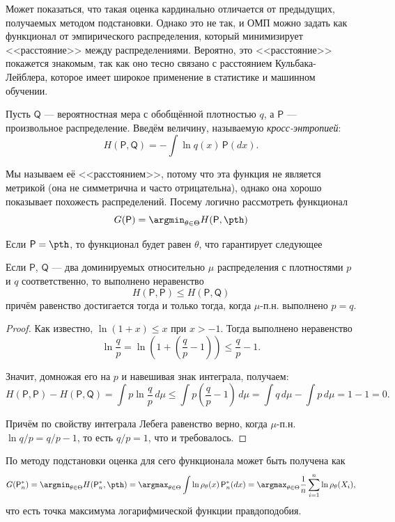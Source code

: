 {\small
Может показаться, что такая оценка кардинально отличается от предыдущих, получаемых методом подстановки. Однако это не так, и ОМП можно задать как функционал от эмпирического распределения, который минимизирует <<расстояние>> между распределениями. Вероятно, это <<расстояние>> покажется знакомым, так как оно тесно связано с расстоянием Кульбака-Лейблера, которое имеет широкое применение в статистике и машинном обучении.

\begin{definition}
    Пусть $\mathsf{Q}$ --- вероятностная мера с обобщённой плотностью $q$, а $\mathsf{P}$ --- произвольное распределение. Введём величину, называемую \textit{кросс-энтропией}:
    \[
    H(\mathsf{P}, \mathsf{Q}) = -\int \ln{q(x)}\,\mathsf{P}(dx). 
    \]
\end{definition}

Мы называем её <<расстоянием>>, потому что эта функция не является метрикой (она не симметрична и часто отрицательна), однако она хорошо показывает похожесть распределений. Посему логично рассмотреть функционал
\[
G(\mathsf{P}) = \argmin_{\theta \in \Theta} H(\mathsf{P}, \pth)
\]

Если $\mathsf{P} = \pth$, то функционал будет равен $\theta$, что гарантирует следующее

\begin{proposition}
    Если $\mathsf{P}$, $\mathsf{Q}$ --- два доминируемых относительно $\mu$ распределения с плотностями $p$ и $q$ соответственно, то выполнено неравенство
    \[
    H(\mathsf{P}, \mathsf{P}) \le H(\mathsf{P}, \mathsf{Q})
    \]
    причём равенство достигается тогда и только тогда, когда $\mu$-п.н. выполнено $p = q$.
\end{proposition}

\begin{proof}
    Как известно, $\ln{(1+x)} \le x$ при $x > -1$. Тогда выполнено неравенство
    \[
    \ln{\frac{q}{p}} = \ln{\left(1 + \left(\frac{q}{p} - 1\right)\right)} \le \frac{q}{p} - 1.
    \]

    Значит, домножая его на $p$ и навешивая знак интеграла, получаем:
    \[
    H(\mathsf{P}, \mathsf{P}) - H(\mathsf{P}, \mathsf{Q}) = \int p \ln{\frac{q}{p}}\,d\mu \le \int p \left(\frac{q}{p} - 1\right)\,d\mu = \int q \,d\mu - \int p \,d\mu = 1 - 1 = 0.
    \]

    Причём по свойству интеграла Лебега равенство верно, когда $\mu$-п.н. $\ln{q/p} = q/p - 1$, то есть $q/p = 1$, что и требовалось.
\end{proof}

По методу подстановки оценка для сего функционала может быть получена как
\[
G(\mathsf{P}^*_n) = \argmin_{\theta\in\Theta} H(\mathsf{P}^*_n, \pth) = \argmax_{\theta\in\Theta} \int \ln{\rho_{\theta}(x)}\,\mathsf{P}^*_n(dx) = \argmax_{\theta\in\Theta} \frac{1}{n}\sum_{i=1}^n \ln{\rho_{\theta}(X_i)},
\]
что есть точка максимума логарифмической функции правдоподобия.}


